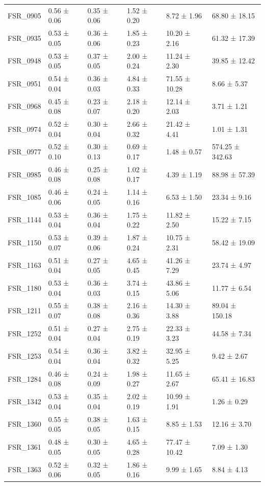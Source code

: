\begin{tabular}{llllll}
FSR_0905 & 0.56 ± 0.06 & 0.35 ± 0.06 & 1.52 ± 0.20 & 8.72 ± 1.96 & 68.80 ± 18.15 \\
FSR_0935 & 0.53 ± 0.05 & 0.36 ± 0.06 & 1.85 ± 0.23 & 10.20 ± 2.16 & 61.32 ± 17.39 \\
FSR_0948 & 0.53 ± 0.05 & 0.37 ± 0.05 & 2.00 ± 0.24 & 11.24 ± 2.30 & 39.85 ± 12.42 \\
FSR_0951 & 0.54 ± 0.04 & 0.36 ± 0.03 & 4.84 ± 0.33 & 71.55 ± 10.28 & 8.66 ± 5.37 \\
FSR_0968 & 0.45 ± 0.08 & 0.23 ± 0.07 & 2.18 ± 0.20 & 12.14 ± 2.03 & 3.71 ± 1.21 \\
FSR_0974 & 0.52 ± 0.04 & 0.30 ± 0.04 & 2.66 ± 0.32 & 21.42 ± 4.41 & 1.01 ± 1.31 \\
FSR_0977 & 0.52 ± 0.10 & 0.30 ± 0.13 & 0.69 ± 0.17 & 1.48 ± 0.57 & 574.25 ± 342.63 \\
FSR_0985 & 0.46 ± 0.08 & 0.25 ± 0.08 & 1.02 ± 0.17 & 4.39 ± 1.19 & 88.98 ± 57.39 \\
FSR_1085 & 0.46 ± 0.06 & 0.24 ± 0.05 & 1.14 ± 0.16 & 6.53 ± 1.50 & 23.34 ± 9.16 \\
FSR_1144 & 0.53 ± 0.04 & 0.36 ± 0.04 & 1.75 ± 0.22 & 11.82 ± 2.50 & 15.22 ± 7.15 \\
FSR_1150 & 0.53 ± 0.07 & 0.39 ± 0.06 & 1.87 ± 0.24 & 10.75 ± 2.31 & 58.42 ± 19.09 \\
FSR_1163 & 0.51 ± 0.04 & 0.27 ± 0.05 & 4.65 ± 0.45 & 41.26 ± 7.29 & 23.74 ± 4.97 \\
FSR_1180 & 0.53 ± 0.04 & 0.36 ± 0.03 & 3.74 ± 0.15 & 43.86 ± 5.06 & 11.77 ± 6.54 \\
FSR_1211 & 0.55 ± 0.07 & 0.38 ± 0.08 & 2.16 ± 0.36 & 14.30 ± 3.88 & 89.04 ± 150.18 \\
FSR_1252 & 0.51 ± 0.04 & 0.27 ± 0.04 & 2.75 ± 0.19 & 22.33 ± 3.23 & 44.58 ± 7.34 \\
FSR_1253 & 0.54 ± 0.04 & 0.36 ± 0.04 & 3.82 ± 0.32 & 32.95 ± 5.25 & 9.42 ± 2.67 \\
FSR_1284 & 0.46 ± 0.08 & 0.24 ± 0.09 & 1.98 ± 0.27 & 11.65 ± 2.67 & 65.41 ± 16.83 \\
FSR_1342 & 0.53 ± 0.04 & 0.35 ± 0.04 & 2.02 ± 0.19 & 10.99 ± 1.91 & 1.26 ± 0.29 \\
FSR_1360 & 0.55 ± 0.05 & 0.38 ± 0.05 & 1.63 ± 0.15 & 8.85 ± 1.53 & 12.16 ± 3.70 \\
FSR_1361 & 0.48 ± 0.05 & 0.30 ± 0.05 & 4.65 ± 0.28 & 77.47 ± 10.42 & 7.09 ± 1.30 \\
FSR_1363 & 0.52 ± 0.06 & 0.32 ± 0.05 & 1.86 ± 0.16 & 9.99 ± 1.65 & 8.84 ± 4.13 \\

\end{tabular}
